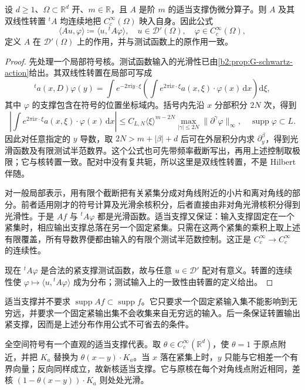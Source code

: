\begin{proposition}[通过转置延拓到一般分布]
\label{b2:prop:G-distribution-action}
设 \(d\ge1\)、\(\Omega\subset\mathbb R^d\) 开、\(m\in\mathbb R\)，且 \(A\) 是阶 \(m\) 的适当支撑伪微分算子。则 \(A\) 及其双线性转置 \({}^tA\) 均连续地把 \(C_c^\infty(\Omega)\) 映入自身。因此公式
\[
 \langle Au,\varphi\rangle
 \coloneqq\langle u,{}^tA\varphi\rangle,
 \quad u\in\mathcal D'(\Omega),\quad\varphi\in C_c^\infty(\Omega),
\]
定义 \(A\) 在 \(\mathcal D'(\Omega)\) 上的作用，并与测试函数上的原作用一致。
\end{proposition}
\begin{proof}
先处理一个局部符号核。测试函数输入的光滑性已由\cref{b2:prop:G-schwartz-action}给出。其双线性转置在局部可写成
\[
 {}^ta(x,D)\varphi(y)
 =\int e^{-2\pi\mathrm iy\cdot\xi}
       \left(\int e^{2\pi\mathrm ix\cdot\xi}
                    a(x,\xi)\cdot\varphi(x)\,\mathrm dx\right)\mathrm d\xi,
\]
其中 \(\varphi\) 的支撑包含在符号的位置坐标域内。括号内先沿 \(x\) 分部积分 \(2N\) 次，得到
\[
 \left|\int e^{2\pi\mathrm ix\cdot\xi}
                  a(x,\xi)\cdot\varphi(x)\,\mathrm dx\right|
 \le C_{L,N}\langle\xi\rangle^{m-2N}
             \max_{|\gamma|\le2N}\|\partial^\gamma\varphi\|_\infty,
 \quad\operatorname{supp}\varphi\subset L.
\]
因此对任意指定的 \(y\) 导数，取 \(2N>m+|\beta|+d\) 后可在外层积分内求 \(\partial_y^\beta\)，得到光滑函数及有限测试半范数界。这个公式也可先带频率截断写出，再用上述控制取极限；它与核转置一致。配对中没有复共轭，所以这里是双线性转置，不是 Hilbert 伴随。

对一般局部表示，用有限个截断把有关紧集分成对角线附近的小片和离对角线的部分。前者适用刚才的符号计算及光滑余核积分，后者直接由非对角光滑核积分得到光滑性。于是 \(Af\) 与 \({}^tA\varphi\) 都是光滑函数。适当支撑又保证：输入支撑固定在一个紧集时，相应输出支撑总落在另一个固定紧集。只需在这两个紧集的乘积上取上述有限覆盖，所有导数界便都由输入的有限个测试半范数控制。这正是 \(C_c^\infty\to C_c^\infty\) 的连续性。

现在 \({}^tA\varphi\) 是合法的紧支撑测试函数，故与任意 \(u\in\mathcal D'\) 配对有意义。转置的连续性使 \(\varphi\mapsto\langle u,{}^tA\varphi\rangle\) 成为分布；测试输入上的一致性由转置的定义给出。
\end{proof}
适当支撑并不要求 \(\operatorname{supp}Af\subset\operatorname{supp}f\)。它只要求一个固定紧输入集不能影响到无穷远，并要求一个固定紧输出集不会收集来自无穷远的输入。后一条保证转置输出紧支撑，因而是上述分布作用公式不可省去的条件。

\ProseParagraphBreak
全空间符号有一个直观的适当支撑代表。取 \(\theta\in C_c^\infty(\mathbb R^d)\)，使 \(\theta=1\) 于原点附近，并把 \(K_a\) 替换为 \(\theta(x-y)\cdot K_a\)。当 \(x\) 落在紧集上时，\(y\) 只能与它相差一个有界向量；反向同样成立，故新核适当支撑。它与原核在每个对角线点附近相同，差核 \((1-\theta(x-y))\cdot K_a\) 则处处光滑。

